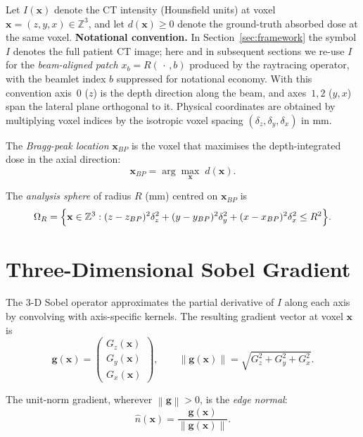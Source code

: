 \documentclass[11pt,a4paper]{article}
\newcommand{\vx}{\mathbf{x}}
\newcommand{\vg}{\mathbf{g}}
\newcommand{\norm}[1]{\left\|#1\right\|}
\begin{document}
Let $I(\vx)$ denote the CT intensity (Hounsfield units) at voxel
$\vx = (z,y,x) \in \mathbb{Z}^3$, and let $d(\vx) \geq 0$ denote the
ground-truth absorbed dose at the same voxel.
\textbf{Notational convention.}  In Section~\ref{sec:framework} the symbol
$I$ denotes the full patient CT image; here and in subsequent sections we
re-use $I$ for the \emph{beam-aligned patch} $x_b = R(\,\cdot\,,b)$ produced
by the raytracing operator, with the beamlet index $b$ suppressed for
notational economy.  With this convention axis~$0$ ($z$) is the depth
direction along the beam, and axes~$1,2$ ($y,x$) span the lateral plane
orthogonal to it.
Physical coordinates are obtained by multiplying voxel indices by the
isotropic voxel spacing $(\delta_z, \delta_y, \delta_x)$ in mm.

The \emph{Bragg-peak location} $\vx_{BP}$ is the voxel that maximises the
depth-integrated dose in the axial direction:
\begin{equation}
    \vx_{BP} = \arg\max_{\vx}\; d(\vx).
\end{equation}

The \emph{analysis sphere} of radius $R$ (mm) centred on $\vx_{BP}$ is
\begin{equation}
    \Omega_R
    = \Bigl\{\vx \in \mathbb{Z}^3 :
        (z - z_{BP})^2\delta_z^2
      + (y - y_{BP})^2\delta_y^2
      + (x - x_{BP})^2\delta_x^2
      \leq R^2 \Bigr\}.
\end{equation}

\section{Three-Dimensional Sobel Gradient}

The 3-D Sobel operator approximates the partial derivative of $I$ along each
axis by convolving with axis-specific kernels.
The resulting gradient vector at voxel $\vx$ is
\begin{equation}
    \vg(\vx)
    = \begin{pmatrix} G_z(\vx) \\ G_y(\vx) \\ G_x(\vx) \end{pmatrix},
    \qquad
    \norm{\vg(\vx)} = \sqrt{G_z^2 + G_y^2 + G_x^2}.
\end{equation}

The unit-norm gradient, wherever $\norm{\vg} > 0$, is the
\emph{edge normal}:
\begin{equation}
    \hat{n}(\vx) = \frac{\vg(\vx)}{\norm{\vg(\vx)}}.
\end{equation}
\end{document}
